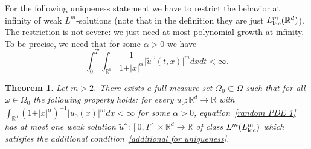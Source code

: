 \documentclass[a4paper,10pt]{article}
\newtheorem{theorem}{Theorem}[section]
\newcommand\1{\mathbbm{1}}
\newcommand\loc{{\rm loc}}
\numberwithin{equation}{section}
\begin{document}
For the following uniqueness statement we have to restrict the behavior at infinity of weak $L^{m}$-solutions (note that in the definition they are just $L_{\loc}^{m}(\mathbb{R}^{d})$). The restriction is not severe: we just need at most polynomial growth at infinity. To be precise, we need that for some $\alpha>0$ we have
\begin{equation}
\int_{0}^{T}\int_{\mathbb{R}^{d}}\frac{1}{1+ \vert x \vert^{\alpha}} \vert \widetilde{u}^\omega(t,x) \vert^{m}dx dt<\infty .\label{additional for uniqueness}
\end{equation}

\begin{theorem}\label{pathbypath uniq SPDE}
Let $m>2$. There exists a full measure set $\Omega_{0}\subset\Omega$ such that for all $\omega\in\Omega_{0}$ the following property holds: for every $u_{0} \colon \mathbb{R}^{d}\rightarrow\mathbb{R}$ with $\int_{\mathbb{R}^{d}} (1+ \vert x \vert^{\alpha})^{-1} \vert u_{0}(x) \vert^{m}dx<\infty$ for some
$\alpha>0$, equation~\eqref{random PDE 1} has at most one weak solution $\widetilde{u}^\omega \colon [0,T] \times \mathbb{R}^{d}\rightarrow\mathbb{R}$ of class $L^{m}(L^{m}_\loc)$ which satisfies the additional condition~\eqref{additional for uniqueness}.
\end{theorem}
\end{document}
